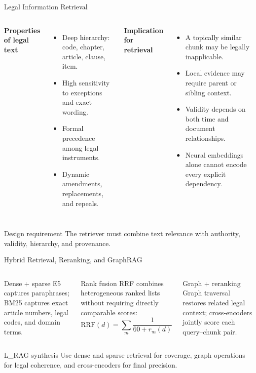 \begin{frame}{Legal Information Retrieval}
\small
\begin{columns}[T]
    \textbf{Properties of legal text}
    \begin{itemize}
      \item Deep hierarchy: code, chapter, article, clause, item.
      \item High sensitivity to exceptions and exact wording.
      \item Formal precedence among legal instruments.
      \item Dynamic amendments, replacements, and repeals.
    \end{itemize}
    \textbf{Implication for retrieval}
    \begin{itemize}
      \item A topically similar chunk may be legally inapplicable.
      \item Local evidence may require parent or sibling context.
      \item Validity depends on both time and document relationships.
      \item Neural embeddings alone cannot encode every explicit dependency.
    \end{itemize}
\end{columns}
\vspace{0.2cm}
\begin{block}{Design requirement}
The retriever must combine text relevance with authority, validity, hierarchy, and provenance.
\end{block}
\end{frame}

\begin{frame}{Hybrid Retrieval, Reranking, and GraphRAG}
\scriptsize
\begin{columns}[T]
    \begin{block}{Dense + sparse}
    E5 captures paraphrases; BM25 captures exact article numbers, legal codes, and domain terms.
    \end{block}
    \begin{block}{Rank fusion}
    RRF combines heterogeneous ranked lists without requiring directly comparable scores:
    \[
      \mathrm{RRF}(d)=\sum_m \frac{1}{60+r_m(d)}
    \]
    \end{block}
    \begin{block}{Graph + reranking}
    Graph traversal restores related legal context; cross-encoders jointly score each query--chunk pair.
    \end{block}
\end{columns}
\vspace{0.3cm}
\begin{alertblock}{L\_RAG synthesis}
Use dense and sparse retrieval for coverage, graph operations for legal coherence, and cross-encoders for final precision.
\end{alertblock}
\end{frame}
